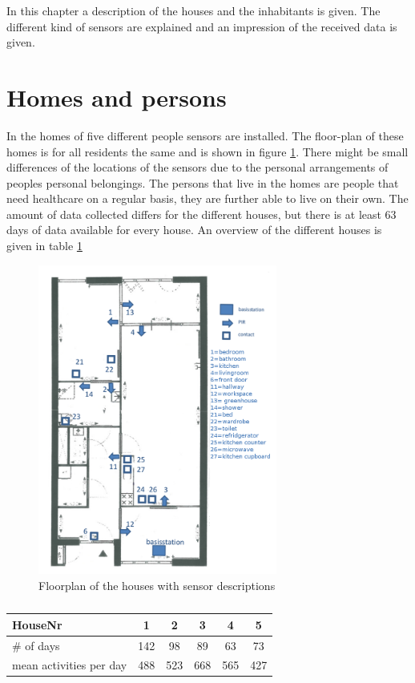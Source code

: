 In this chapter a description of the houses and the inhabitants is given. The different kind of sensors are explained and an impression of the received data is given.

\section{Homes and persons}
In the homes of five different people sensors are installed. The floor-plan of these homes is for all residents the same and is shown in figure \ref{fig:floorplan}. There might be small differences of the locations of the sensors due to the personal arrangements of peoples personal belongings.
The persons that live in the homes are people that need healthcare on a regular basis, they are further able to live on their own. The amount of data collected differs for the different houses, but there is at least 63 days of data available for every house. An overview of the different houses is given in table \ref{table:houses}

\begin{figure}
\centering
 \includegraphics[width=0.7\textwidth]{Pictures/floorplan.png}
 \caption{Floorplan of the houses with sensor descriptions}
 \label{fig:floorplan}
\end{figure}


\begin{table}[h]
\centering
\begin{tabular}{lccccc}
\centering
HouseNr & 1 & 2 & 3 & 4 & 5 \\
\hline
\# of days & 142 & 98 & 89 & 63 & 73 \\
mean activities per day & 488 & 523 & 668 & 565 & 427 \\
\end{tabular}
\caption{ }
\label{table:houses}
\end{table}




